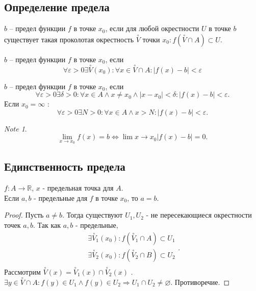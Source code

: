 \documentclass[11pt]{book}
\newcommand{\R}{\mathbb{R}}
\theoremstyle{definition}
\theoremstyle{plain}
\theoremstyle{plain}
\theoremstyle{definition}
\theoremstyle{remark}
\newtheorem*{note}{Note}
\begin{document}
\subsection{Определение предела}\label{ques_14}
\begin{defn}
    $b$ -- предел функции $f$ в точке  $x_0$, если для любой окрестности  $U$ в точке $b$ существует такая проколотая окрестность $\stackrel{\circ} V$ точки $x_0: f(\stackrel{\circ} V\cap A) \subset U$.
\end{defn}
\begin{defn}
    $b$ -- предел функции $f$ в точке  $x_0$, если
    $$\forall \varepsilon >0 \exists \stackrel{\circ} V (x_0): \forall x \in  \stackrel{\circ} V \cap A: |f(x)-b| < \varepsilon  $$
\end{defn}
\begin{defn}
    $b$ -- предел функции $f$ в точке  $x_0$, если
    \[
	\forall \varepsilon >0 \exists \delta >0 :\forall x \in A \wedge x \ne x_0 \wedge |x-x_0|<\delta : |f(x)-b| < \varepsilon 
    .\] 
    Если $x_0 = \infty$ :
    \[
	\forall \varepsilon >0 \exists N >0 :\forall x \in A \wedge x > N : |f(x)-b| < \varepsilon 
    .\] 
\end{defn}
\begin{note}
    \[
	\lim \limits_{x \to x_0} f(x) = b \Longleftrightarrow \lim \limits{x \to x_0} |f(x) -b|=0
    .\] 
\end{note}
\subsection{Единственность предела}\label{ques_15}
\begin{thm}
    $f : A \to \R$, $x$ - предельная точка для $A$.\\
    Если $a, b$ - предельные для $f$ в точке $x_0$, то $a=b$.
\end{thm}
\begin{proof}
    Пусть $a\ne b$. Тогда существуют $U_1 , U_2$ - не пересекающиеся окрестности точек $a, b$. Так как $a, b$ - предельные, \[
	\begin{array}{c}
	    \exists \stackrel{\circ} V_1 (x_0): f(\stackrel{\circ} V_1 \cap A) \subset U_1 \\
	    \exists \stackrel{\circ} V_2 (x_0): f(\stackrel{\circ} V_2 \cap B) \subset U_2 \\
    \end{array}
    .\] 
    Рассмотрим $\stackrel{\circ} V(x) = \stackrel{\circ} V_1(x) \cap \stackrel{\circ} V_2(x)$ . $\exists y \in  \stackrel{\circ}V \cap A: f(y) \in  U_1 \wedge f(y) \in  U_2 \Rightarrow U_1 \cap U_2 \ne \varnothing$. Противоречие. 
\end{proof}
\end{document}
